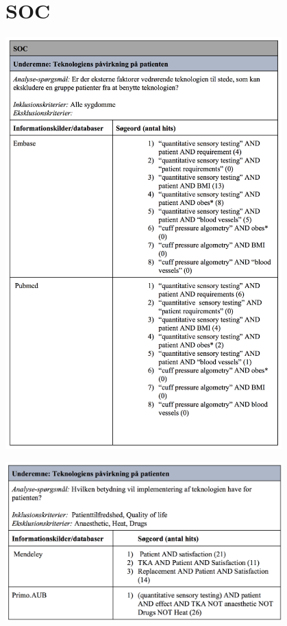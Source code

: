 \section{SOC}\label{SOC_sog}
\begin{center}
\includegraphics[width=0.8\textwidth]{rapportAfsnit/qBilag/sogninger/SOC1}

\includegraphics[width=0.8\textwidth]{rapportAfsnit/qBilag/sogninger/SOC2}
\end{center}

